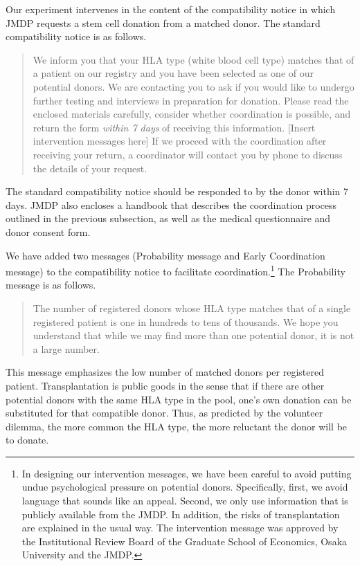 \documentclass[
]{article}
\begin{document}
Our experiment intervenes in the content of the compatibility notice in which JMDP requests a stem cell donation from a matched donor. The standard compatibility notice is as follows.

\begin{quote}
We inform you that your HLA type (white blood cell type) matches that of a patient on our registry and you have been selected as one of our potential donors. We are contacting you to ask if you would like to undergo further testing and interviews in preparation for donation. Please read the enclosed materials carefully, consider whether coordination is possible, and return the form \emph{within 7 days} of receiving this information. {[}Insert intervention messages here{]} If we proceed with the coordination after receiving your return, a coordinator will contact you by phone to discuss the details of your request.
\end{quote}

The standard compatibility notice should be responded to by the donor within 7 days. JMDP also encloses a handbook that describes the coordination process outlined in the previous subsection, as well as the medical questionnaire and donor consent form.

We have added two messages (Probability message and Early Coordination message) to the compatibility notice to facilitate coordination.\footnote{In designing our intervention messages, we have been careful to avoid putting undue psychological pressure on potential donors. Specifically, first, we avoid language that sounds like an appeal. Second, we only use information that is publicly available from the JMDP. In addition, the risks of transplantation are explained in the usual way. The intervention message was approved by the Institutional Review Board of the Graduate School of Economics, Osaka University and the JMDP.} The Probability message is as follows.

\begin{quote}
The number of registered donors whose HLA type matches that of a single registered patient is one in hundreds to tens of thousands. We hope you understand that while we may find more than one potential donor, it is not a large number.
\end{quote}

This message emphasizes the low number of matched donors per registered patient. Transplantation is public goods in the sense that if there are other potential donors with the same HLA type in the pool, one's own donation can be substituted for that compatible donor. Thus, as predicted by the volunteer dilemma, the more common the HLA type, the more reluctant the donor will be to donate.
\end{document}
